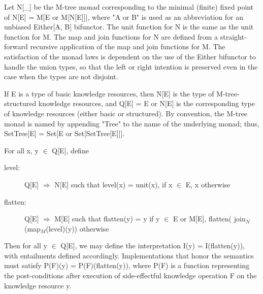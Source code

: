 \documentclass[runningheads]{llncs}
\begin{document}
Let N[\_] be the M-tree monad corresponding to the minimal (finite) fixed point of N[E] = M[E or M[N[E]]], where "A or B" is used as an abbreviation for an unbiased Either[A, B] bifunctor.
The unit function for N is the same as the unit function for M.
The map and join functions for N are defined from a straight-forward recursive application of the map and join functions for M.
The satisfaction of the monad laws is dependent on the use of the Either bifunctor to handle the union types, so that the left or right intention is preserved even in the case when the types are not disjoint. 

If E is a type of basic knowledge resources, then N[E] is the type of M-tree-structured knowledge resources, and
Q[E] = E or N[E] is the corresponding type of knowledge resources (either basic or structured). By convention, the M-tree monad is named by appending "Tree" to the name of the underlying monad; thus, SetTree[E] = Set[E or Set[SetTree[E]]].

For all x, y $\in$ Q[E], define
\begin{description}
\item[level:] Q[E] $\Rightarrow$ N[E]
such that level(x) = unit(x), if x $\in$ E, x otherwise
\item[flatten:] Q[E] $\Rightarrow$ M[E]  
such that flatten(y) = y if y $\in$  E or M[E], flatten( join$_N$(map$_M$(level)(y)) otherwise
\end{description}
Then for all y $\in$ Q[E], we may define the interpretation I(y) = I(flatten(y)), with entailments defined accordingly. %
Implementations that honor the semantics must satisfy P(F)(y) = P(F)(flatten(y)), where P(F) is a function representing the post-conditions after execution of side-effectful knowledge operation F on the knowledge resource y.
\end{document}
